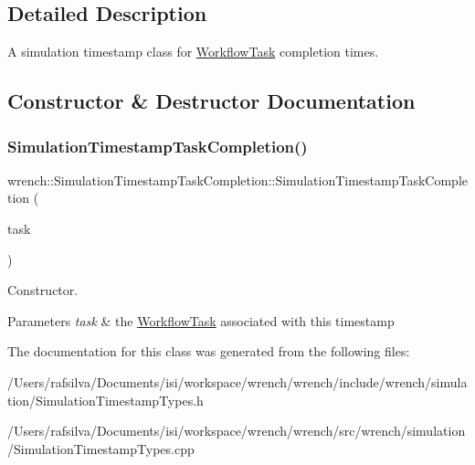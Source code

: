 \subsection{Detailed Description}
A simulation timestamp class for \hyperlink{classwrench_1_1_workflow_task}{Workflow\+Task} completion times. 

\subsection{Constructor \& Destructor Documentation}
\mbox{\label{classwrench_1_1_simulation_timestamp_task_completion_acfb9112fa3c1ec579a3ecba1b8069a29}} 
\subsubsection{\texorpdfstring{Simulation\+Timestamp\+Task\+Completion()}{SimulationTimestampTaskCompletion()}}
{\footnotesize\ttfamily wrench\+::\+Simulation\+Timestamp\+Task\+Completion\+::\+Simulation\+Timestamp\+Task\+Completion (\begin{DoxyParamCaption}\item[{\hyperlink{classwrench_1_1_workflow_task}{Workflow\+Task} $\ast$}]{task }\end{DoxyParamCaption})}



Constructor. 


\begin{DoxyParams}{Parameters}
{\em task} & the \hyperlink{classwrench_1_1_workflow_task}{Workflow\+Task} associated with this timestamp \\
\hline
\end{DoxyParams}


The documentation for this class was generated from the following files\+:\begin{DoxyCompactItemize}
\item 
/\+Users/rafsilva/\+Documents/isi/workspace/wrench/wrench/include/wrench/simulation/Simulation\+Timestamp\+Types.\+h\item 
/\+Users/rafsilva/\+Documents/isi/workspace/wrench/wrench/src/wrench/simulation/Simulation\+Timestamp\+Types.\+cpp\end{DoxyCompactItemize}
